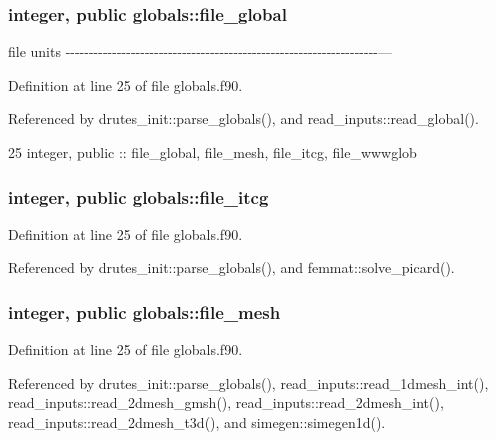 \subsubsection[{file\+\_\+global}]{\setlength{\rightskip}{0pt plus 5cm}integer, public globals\+::file\+\_\+global}\label{namespaceglobals_abb24fe7a6f6f433d0534c735cc26364b}


file units -\/-\/-\/-\/-\/-\/-\/-\/-\/-\/-\/-\/-\/-\/-\/-\/-\/-\/-\/-\/-\/-\/-\/-\/-\/-\/-\/-\/-\/-\/-\/-\/-\/-\/-\/-\/-\/-\/-\/-\/-\/-\/-\/-\/-\/-\/-\/-\/-\/-\/-\/-\/-\/-\/-\/-\/-\/-\/-\/-\/-\/-\/-\/-\/-\/-\/-\/--- 



Definition at line 25 of file globals.\+f90.



Referenced by drutes\+\_\+init\+::parse\+\_\+globals(), and read\+\_\+inputs\+::read\+\_\+global().


\begin{DoxyCode}
25   \textcolor{keywordtype}{integer}, \textcolor{keywordtype}{public} :: file_global,  file_mesh, file_itcg, file_wwwglob
\end{DoxyCode}
\subsubsection[{file\+\_\+itcg}]{\setlength{\rightskip}{0pt plus 5cm}integer, public globals\+::file\+\_\+itcg}\label{namespaceglobals_aca27199acfcaba80ac631f89cc9a44c9}


Definition at line 25 of file globals.\+f90.



Referenced by drutes\+\_\+init\+::parse\+\_\+globals(), and femmat\+::solve\+\_\+picard().

\subsubsection[{file\+\_\+mesh}]{\setlength{\rightskip}{0pt plus 5cm}integer, public globals\+::file\+\_\+mesh}\label{namespaceglobals_a9dc29542694be5bc91cd8b23a300ab13}


Definition at line 25 of file globals.\+f90.



Referenced by drutes\+\_\+init\+::parse\+\_\+globals(), read\+\_\+inputs\+::read\+\_\+1dmesh\+\_\+int(), read\+\_\+inputs\+::read\+\_\+2dmesh\+\_\+gmsh(), read\+\_\+inputs\+::read\+\_\+2dmesh\+\_\+int(), read\+\_\+inputs\+::read\+\_\+2dmesh\+\_\+t3d(), and simegen\+::simegen1d().

